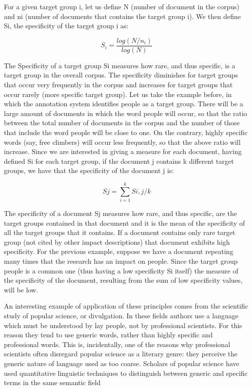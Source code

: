 \documentclass[]{book}
\theoremstyle{definition}
\theoremstyle{definition}
\theoremstyle{definition}
\theoremstyle{remark}
\begin{document}
For a given target group i, let us define N (number of document in the
corpus) and ni (number of documents that contains the target group i).
We then define Si, the specificity of the target group i as:

\begin{equation*} 
S_i= \frac{log(N/n_i)}{log(N)}
\end{equation*}

The Specificity of a target group Si measures how rare, and thus
specific, is a target group in the overall corpus. The specificity
diminishes for target groups that occur very frequently in the corpus
and increases for target groups that occur rarely (more specific target
group). Let us take the example before, in which the annotation system
identifies people as a target group. There will be a large amount of
documents in which the word people will occur, so that the ratio between
the total number of documents in the corpus and the number of those that
include the word people will be close to one. On the contrary, highly
specific words (say, free climbers) will occur less frequently, so that
the above ratio will increase. Since we are interested in giving a
measure for each document, having defined Si for each target group, if
the document j contains k different target groups, we have that the
specificity of the document j is:

\begin{equation*} 
Sj=\sum_{i=1}^{k}Si,j/k
\end{equation*}

The specificity of a document Sj measures how rare, and thus specific,
are the target groups contained in that document and it is the mean of
the specificity of all the target groups that it contains. If a document
contains only rare target group (not cited by other impact descriptions)
that document exhibits high specificity. For the previous example,
suppose we have a document repeating many times that the research has an
impact on people. Since the target group people is a common one (thus
having a low specificity Si itself) the measure of the specificity of
the document, resulting from the sum of low specificity values, will be
low.

An interesting example of application of these principles comes from the
scientific study of popular science, or divulgation. In these fields
authors use a language which must be understood by lay people, not by
professional scientists. For this reason they tend to use generic words,
rather than highly specific and professional words. This is,
incidentally, one of the reasons why professional scientists often
disregard popular science as a literary genre: they perceive the generic
nature of language used as too coarse. Scholars of popular science have
used quantitative linguistic techniques to distinguish between generic
and specific terms in the same semantic field
\citep{jacobi1999communication}
\end{document}

